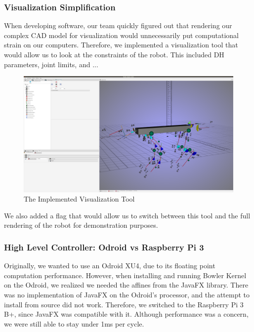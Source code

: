     \subsubsection{Visualization Simplification}
        When developing software, our team quickly figured out that rendering our complex CAD model for visualization would unnecessarily put computational strain on our computers. Therefore, we implemented a visualization tool that would allow us to look at the constraints of the robot. This included DH parameters, joint limits, and ...
        \begin{figure}
            \centering
            \includegraphics{figures/BowlerVis.png}
            \caption{The Implemented Visualization Tool}
            \label{fig:VisualizationTool}
        \end{figure}
        
        We also added a flag that would allow us to switch between this tool and the full rendering of the robot for demonstration purposes.
    \subsubsection{High Level Controller: Odroid vs Raspberry Pi 3}
        Originally, we wanted to use an Odroid XU4, due to its floating point computation performance. However, when installing and running Bowler Kernel on the Odroid, we realized we needed the affines from the JavaFX library. There was no implementation of JavaFX on the Odroid's processor, and the attempt to install from source did not work. Therefore, we switched to the Raspberry Pi 3 B+, since JavaFX was compatible with it. Although performance was a concern, we were still able to stay under 1ms per cycle.
